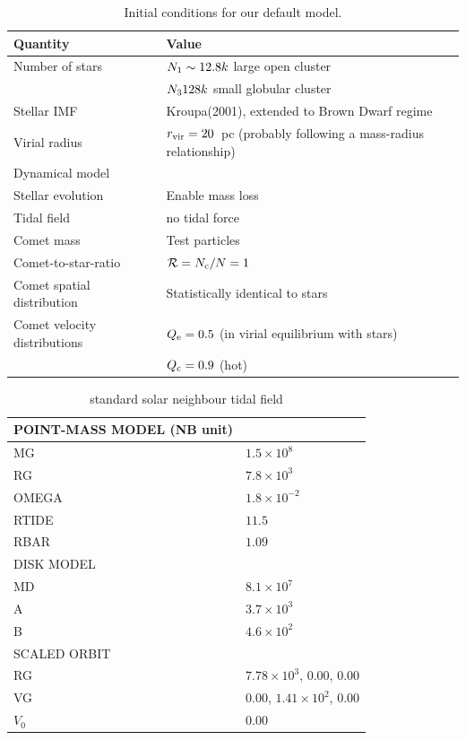 \documentclass[usenatbib]{mn2e}
\newcommand{\ncomets}{N_{\rm c}}
\newcommand{\ratio}{\mathcal{R}}
\newcommand{\rvir}{r_{\rm vir}}
\newcommand{\qc}{Q_{\rm c}}
\newcommand{\qe}{Q_{\rm e}}
\newcommand{\nna}{N_{\rm 1}}
\newcommand{\nnc}{N_{\rm 3}}
\begin{document}
\begin{table}
\caption{Initial conditions for our default model.  \label{table:initial}}
\begin{tabular}{ll}
\hline
\hline
Quantity & Value \\
\hline
Number of stars & $ \nna  \sim 12.8k $ large open cluster \\
 & $\nnc  128k$  small globular cluster \\


Stellar IMF &  Kroupa(2001), extended to Brown Dwarf regime\\ %
Virial radius & $\rvir=20$~pc (probably following a mass-radius relationship) \\
Dynamical model & \cite{Plummer:1911aa} \\
Stellar evolution &  Enable mass loss \\ %
Tidal field & no tidal force\\ %
\hline
Comet mass & Test particles \\
Comet-to-star-ratio & $\ratio=\ncomets/N= 1$ \\
Comet spatial distribution & Statistically identical to stars \\
Comet velocity distributions & $\qe=0.5$ (in virial equilibrium with stars) \\
	& $\qc=0.9$ (hot) \\
\hline
\hline
\end{tabular}
\end{table}


\begin{table}
\caption{standard solar neighbour tidal field \label{table:tidal}}
\begin{tabular}{ll}
\hline
\hline
POINT-MASS MODEL (NB unit) \\
\hline
  MG  & $1.5 \times 10^8$  \\
  RG  &  $7.8 \times 10^3$  \\
  OMEGA & $1.8 \times 10^{-2}$ \\
  RTIDE & $11.5$  \\
  RBAR & $1.09$ \\
\hline
DISK MODEL \\
\hline
    MD &  $8.1 \times10^7$  \\
    A &  $3.7 \times10^3$  \\
    B &  $4.6 \times10^2$\\
\hline
SCALED ORBIT\\
\hline
    RG &  $7.78 \times 10^3$,  0.00,  0.00  \\
    VG &   0.00,  $1.41 \times10^2$,  0.00  \\
    $V_{0}$ &   $0.00$\\
\hline
\hline
\end{tabular}
\end{table}
\end{document}
